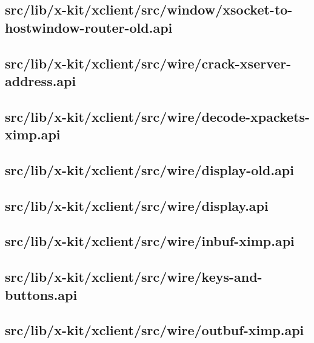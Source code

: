 \subsection{src/lib/x-kit/xclient/src/window/xsocket-to-hostwindow-router-old.api}


\subsection{src/lib/x-kit/xclient/src/wire/crack-xserver-address.api}


\subsection{src/lib/x-kit/xclient/src/wire/decode-xpackets-ximp.api}


\subsection{src/lib/x-kit/xclient/src/wire/display-old.api}


\subsection{src/lib/x-kit/xclient/src/wire/display.api}


\subsection{src/lib/x-kit/xclient/src/wire/inbuf-ximp.api}


\subsection{src/lib/x-kit/xclient/src/wire/keys-and-buttons.api}


\subsection{src/lib/x-kit/xclient/src/wire/outbuf-ximp.api}


